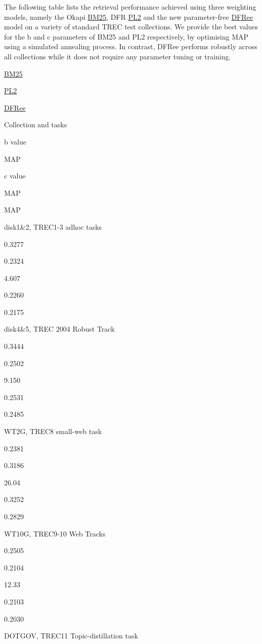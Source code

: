 \href{}{}

The following table lists the retrieval performance achieved using three
weighting models, namely the Okapi
\href{javadoc/org/terrier/matching/models/BM25.html}{BM25}, DFR
\href{javadoc/org/terrier/matching/models/PL2.html}{PL2} and the new
parameter-free
\href{javadoc/org/terrier/matching/models/DFRee.html}{DFRee} model on a
variety of standard TREC test collections. We provide the best values
for the b and c parameters of BM25 and PL2 respectively, by optimising
MAP using a simulated annealing process. In contrast, DFRee performs
robustly across all collections while it does not require any parameter
tuning or training.

\href{javadoc/org/terrier/matching/models/BM25.html}{BM25}

\href{javadoc/org/terrier/matching/models/PL2.html}{PL2}

\href{javadoc/org/terrier/matching/models/DFRee.html}{DFRee}

Collection and tasks

b value

MAP

c value

MAP

MAP

disk1\&2, TREC1-3 adhoc tasks

0.3277

0.2324

4.607

0.2260

0.2175

disk4\&5, TREC 2004 Robust Track

0.3444

0.2502

9.150

0.2531

0.2485

WT2G, TREC8 small-web task

0.2381

0.3186

26.04

0.3252

0.2829

WT10G, TREC9-10 Web Tracks

0.2505

0.2104

12.33

0.2103

0.2030

DOTGOV, TREC11 Topic-distillation task


